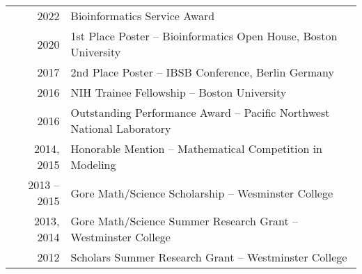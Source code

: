 \documentclass[a4paper,10pt]{article}
\begin{document}
\section{\color{linkcolour}{Honors and Awards}}
\begin{tabular}{rl}
	2022         & Bioinformatics Service Award                                           \\
	2020         & 1st Place Poster -- Bioinformatics Open House, Boston University       \\
	2017         & 2nd Place Poster -- IBSB Conference, Berlin Germany                    \\
	2016         & NIH Trainee Fellowship -- Boston University                            \\
	2016         & Outstanding Performance Award -- Pacific Northwest National Laboratory \\
	2014, 2015   & Honorable Mention -- Mathematical Competition in Modeling              \\
	2013 -- 2015 & Gore Math/Science Scholarship -- Wesminster College                    \\
	2013, 2014   & Gore Math/Science Summer Research Grant -- Westminster College         \\
	2012         & Scholars Summer Research Grant -- Westminster College
\end{tabular}

\end{document}
